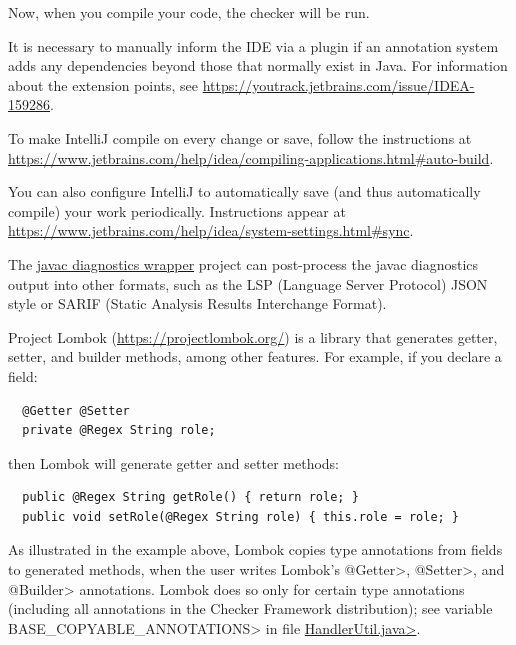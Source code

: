 Now, when you compile your code, the checker will be run.

It is necessary to manually inform the IDE via a plugin if an annotation
system adds any dependencies beyond those that normally exist in Java.
For information about the extension points, see
\url{https://youtrack.jetbrains.com/issue/IDEA-159286}.



To make IntelliJ compile on every change or save,
follow the instructions at
\url{https://www.jetbrains.com/help/idea/compiling-applications.html#auto-build}.

You can also configure IntelliJ to automatically save (and thus
automatically compile) your work periodically. Instructions appear at
\url{https://www.jetbrains.com/help/idea/system-settings.html#sync}.


The \href{https://github.com/eisopux/javac-diagnostics-wrapper}{javac
diagnostics wrapper} project can post-process the javac
diagnostics output into other formats, such as
the LSP (Language Server Protocol) JSON style or
SARIF (Static Analysis Results Interchange Format).



Project Lombok (\url{https://projectlombok.org/}) is a library that
generates getter, setter, and builder methods, among other features.
For example, if you declare
a field:

\begin{Verbatim}
  @Getter @Setter
  private @Regex String role;
\end{Verbatim}

\noindent
then Lombok will generate getter and setter methods:

\begin{Verbatim}
  public @Regex String getRole() { return role; }
  public void setRole(@Regex String role) { this.role = role; }
\end{Verbatim}



As illustrated in the example above, Lombok copies type annotations from fields
to generated methods, when the user writes Lombok's \<@Getter>, \<@Setter>,
and \<@Builder> annotations.  Lombok does so only for certain type
annotations (including all annotations in the Checker Framework
distribution); see variable \<BASE\_COPYABLE\_ANNOTATIONS> in file
\href{https://github.com/projectlombok/lombok/blob/master/src/core/lombok/core/handlers/HandlerUtil.java}{\<HandlerUtil.java>}.

